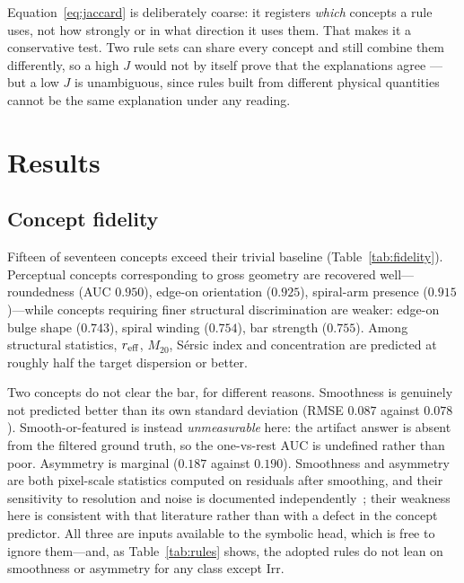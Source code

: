 \documentclass[11pt]{article}
\begin{document}
Equation~\eqref{eq:jaccard} is deliberately coarse: it registers \emph{which}
concepts a rule uses, not how strongly or in what direction it uses them. That
makes it a conservative test. Two rule sets can share every concept and still
combine them differently, so a high $J$ would not by itself prove that the
explanations agree --- but a low $J$ is unambiguous, since rules built from
different physical quantities cannot be the same explanation under any
reading.

\section{Results}
\label{sec:results}

\subsection{Concept fidelity}
\label{sec:fidelity}

Fifteen of seventeen concepts exceed their trivial baseline
(Table~\ref{tab:fidelity}). Perceptual concepts corresponding to
gross geometry are recovered well---roundedness (AUC $0.950$), edge-on
orientation ($0.925$), spiral-arm presence ($0.915$)---while concepts
requiring finer structural discrimination are weaker: edge-on bulge shape
($0.743$), spiral winding ($0.754$), bar strength ($0.755$). Among structural
statistics, $r_{\rm eff}$, $M_{20}$, Sérsic index and concentration are
predicted at roughly half the target dispersion or better.

Two concepts do not clear the bar, for different reasons. Smoothness is
genuinely not predicted better than its own standard deviation (RMSE $0.087$
against $0.078$). Smooth-or-featured is instead \emph{unmeasurable} here: the
artifact answer is absent from the filtered ground truth, so the one-vs-rest
AUC is undefined rather than poor. Asymmetry is marginal ($0.187$ against
$0.190$). Smoothness and asymmetry are both pixel-scale statistics computed on
residuals after smoothing, and their sensitivity to resolution and noise is
documented independently~\citep{ferrari2015}; their weakness here is
consistent with that literature rather than with a defect in the concept
predictor. All three are inputs available to the symbolic head, which is free
to ignore them---and, as Table~\ref{tab:rules} shows, the adopted rules do not
lean on smoothness or asymmetry for any class except Irr.
\end{document}
